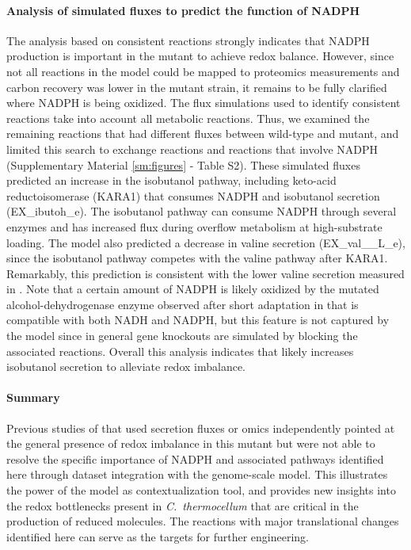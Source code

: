 \paragraph{Analysis of simulated fluxes to predict the function of NADPH}
The analysis based on consistent reactions strongly indicates that NADPH production is important in the mutant to achieve redox balance.
However, since not all reactions in the model could be mapped to proteomics measurements and carbon recovery was lower in the mutant strain,\citep{thompson2015} it remains to be fully clarified where NADPH is being oxidized.
The flux simulations used to identify consistent reactions take into account all metabolic reactions.
Thus, we examined the remaining reactions that had different fluxes between wild-type and mutant, and limited this search to exchange reactions and reactions that involve NADPH (Supplementary Material \ref{sm:figures} - Table S2).
These simulated fluxes predicted an increase in the isobutanol pathway, including keto-acid reductoisomerase (KARA1) that consumes NADPH and isobutanol secretion (EX\_ibutoh\_e).
The isobutanol pathway can consume NADPH through several enzymes\citep{lin2015} and has increased flux during overflow metabolism at high-substrate loading.\citep{holwerda2014,thompson2017}
The model also predicted a decrease in valine secretion (EX\_val\_\_L\_e), since the isobutanol pathway competes with the valine pathway after KARA1.
Remarkably, this prediction is consistent with the lower valine secretion measured in .\citep{biswas2017} %
Note that a certain amount of NADPH is likely oxidized by the mutated alcohol-dehydrogenase enzyme observed after short adaptation in  that is compatible with both NADH and NADPH,\citep{biswas2015} but this feature is not captured by the model since in general gene knockouts are simulated by blocking the associated reactions.
Overall this analysis indicates that  likely increases isobutanol secretion to alleviate redox imbalance.

\paragraph{Summary}
Previous studies of  that used secretion fluxes\citep{thompson2015} or omics\citep{biswas2017} independently pointed at the general presence of redox imbalance in this mutant but were not able to resolve the specific importance of NADPH and associated pathways identified here through dataset integration with the genome-scale model. This illustrates the power of the model as contextualization tool, and provides new insights into the redox bottlenecks present in \textit{C.~thermocellum} that are critical in the production of reduced molecules. The reactions with major translational changes identified here can serve as the targets for further engineering.

